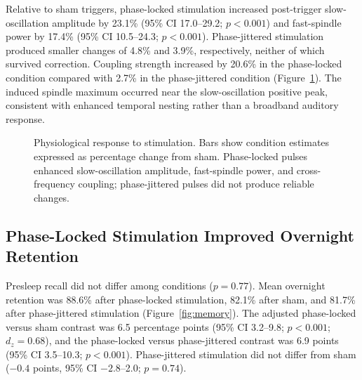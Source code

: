 Relative to sham triggers, phase-locked stimulation increased post-trigger slow-oscillation amplitude by 23.1\% (95\% CI 17.0--29.2; $p<0.001$) and fast-spindle power by 17.4\% (95\% CI 10.5--24.3; $p<0.001$). Phase-jittered stimulation produced smaller changes of 4.8\% and 3.9\%, respectively, neither of which survived correction. Coupling strength increased by 20.6\% in the phase-locked condition compared with 2.7\% in the phase-jittered condition (Figure~\ref{fig:physiology}). The induced spindle maximum occurred near the slow-oscillation positive peak, consistent with enhanced temporal nesting rather than a broadband auditory response.

\begin{figure}[htbp]
\centering
{}
\caption{Physiological response to stimulation. Bars show condition estimates expressed as percentage change from sham. Phase-locked pulses enhanced slow-oscillation amplitude, fast-spindle power, and cross-frequency coupling; phase-jittered pulses did not produce reliable changes.}
\label{fig:physiology}
\end{figure}

\subsection{Phase-Locked Stimulation Improved Overnight Retention}

Presleep recall did not differ among conditions ($p=0.77$). Mean overnight retention was 88.6\% after phase-locked stimulation, 82.1\% after sham, and 81.7\% after phase-jittered stimulation (Figure~\ref{fig:memory}). The adjusted phase-locked versus sham contrast was 6.5 percentage points (95\% CI 3.2--9.8; $p<0.001$; $d_z=0.68$), and the phase-locked versus phase-jittered contrast was 6.9 points (95\% CI 3.5--10.3; $p<0.001$). Phase-jittered stimulation did not differ from sham ($-0.4$ points, 95\% CI $-2.8$--2.0; $p=0.74$).


